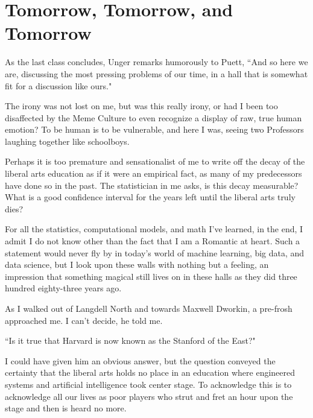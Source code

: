 \documentclass[12pt,letterpaper]{article}
\begin{document}

\section*{Tomorrow, Tomorrow, and Tomorrow}
As the last class concludes, Unger remarks humorously to Puett, ``And so here we are, discussing the most pressing problems of our time, in a hall that is somewhat fit for a discussion like ours."  

The irony was not lost on me, but was this really irony, or had I been too disaffected by the Meme Culture to even recognize a display of raw, true human emotion?  To be human is to be vulnerable, and here I was, seeing two Professors laughing together like schoolboys.

Perhaps it is too premature and sensationalist of me to write off the decay of the liberal arts education as if it were an empirical fact, as many of my predecessors have done so in the past.  The statistician in me asks, is this decay measurable?  What is a good confidence interval for the years left until the liberal arts truly dies?

For all the statistics, computational models, and math I've learned, in the end, I admit I do not know other than the fact that I am a Romantic at heart.  Such a statement would never fly by in today's world of machine learning, big data, and data science, but I look upon these walls with nothing but a feeling, an impression that something magical still lives on in these halls as they did three hundred eighty-three years ago.  

As I walked out of Langdell North and towards Maxwell Dworkin, a pre-frosh approached me.  I can't decide, he told me.

``Is it true that Harvard is now known as the Stanford of the East?"

I could have given him an obvious answer, but the question conveyed the certainty that the liberal arts holds no place in an education where engineered systems and artificial intelligence took center stage.  To acknowledge this is to acknowledge all our lives as poor players who strut and fret an hour upon the stage and then is heard no more.


%
%
\end{document}
